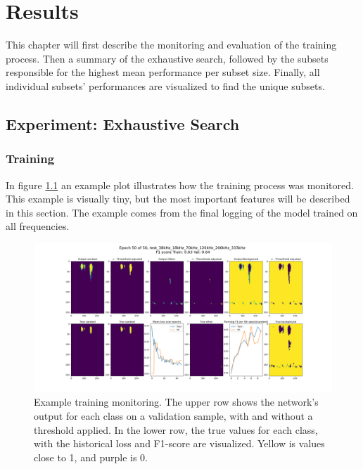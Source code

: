 \chapter{Results} \label{results}
This chapter will first describe the monitoring and evaluation of the training process. Then a summary of the exhaustive search, followed by the subsets responsible for the highest mean performance per subset size. Finally, all individual subsets’ performances are visualized to find the unique subsets. 

\section{Experiment: Exhaustive Search}
    
    \subsection{Training}
        In figure \ref{training_overveiw_fig} an example plot illustrates how the training process was monitored. This example is visually tiny, but the most important features will be described in this section. The example comes from the final logging of the model trained on all frequencies.
        \clearpage
        \begin{figure}[H]

            \hspace*{-3.2cm}
            \includegraphics[scale=0.45]{figures/epoch_50_test_38kHz_18kHz_70kHz_120kHz_200kHz_333kHz.png}
            \caption[Training example monitoring]{Example training monitoring. The upper row shows the network's output for each class on a validation sample, with and without a threshold applied. In the lower row, the true values for each class, with the historical loss and F1-score are visualized. Yellow is values close to 1, and purple is 0.}
          	\medskip 
            \label{training_overveiw_fig}
        \end{figure}
        
